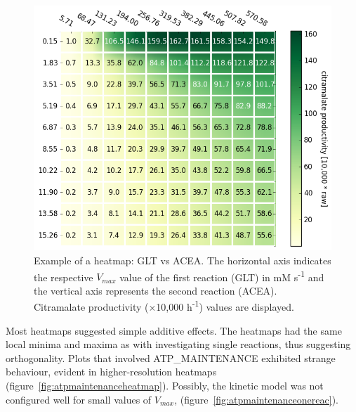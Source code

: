 \documentclass[parskip=full, numbers=noenddot]{scrreprt}
\begin{document}
\begin{figure}[!htbp]
  \centering
  \includegraphics[scale=0.5]{heatmapsample}
  \caption{Example of a heatmap: GLT vs ACEA. The horizontal axis indicates the respective $V_{max}$ value of the first reaction (GLT) in mM s\textsuperscript{-1} and the vertical axis represents the second reaction (ACEA). Citramalate productivity ($\times${}10,000 h\textsuperscript{-1}) values are displayed.}
  \label{fig:heatmapsample}
\end{figure}

Most heatmaps suggested simple additive effects. The heatmaps had the same local minima and maxima as with investigating single reactions, thus suggesting orthogonality. Plots that involved ATP\_MAIN\-TEN\-ANCE exhibited strange behaviour, evident in higher-resolution heatmaps (figure~\ref{fig:atpmaintenanceheatmap}). Possibly, the kinetic model was not configured well for small values of $V_{max}$, (figure~\ref{fig:atpmaintenanceonereac}).
\end{document}
